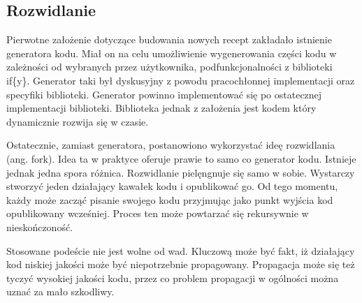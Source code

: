 \documentclass[11pt,a4paper,polish,thesis]{dcsbook}
\begin{document}
\subsection{Rozwidlanie}
Pierwotne założenie dotyczące budowania nowych recept zakładało istnienie generatora kodu. Miał on na celu umożliwienie wygenerowania części kodu w zależności od
wybranych przez użytkownika, podfunkcjonalności z biblioteki if\{y\}. Generator taki był dyskusyjny z powodu pracochłonnej implementacji oraz specyfiki biblioteki.
Generator powinno implementować się po ostatecznej implementacji biblioteki. Biblioteka jednak z założenia jest kodem który dynamicznie rozwija się w czasie.

Ostatecznie, zamiast generatora, postanowiono wykorzystać ideę rozwidlania (ang. fork). Idea ta w praktyce oferuje prawie to samo co generator kodu. Istnieje jednak
jedna spora różnica. Rozwidlanie pielęngnuje się samo w sobie. Wystarczy stworzyć jeden działający kawałek kodu i opublikować go. Od tego momentu, każdy może zacząć pisanie swojego kodu przyjmując jako punkt wyjścia kod opublikowany wcześniej. Proces ten może powtarzać się rekursywnie w nieskończoność.

Stosowane podeście nie jest wolne od wad. Kluczową może być fakt, iż działający kod niskiej jakości może być niepotrzebnie propagowany. Propagacja może się też tyczyć
wysokiej jakości kodu, przez co problem propagacji w ogólności można uznać za mało szkodliwy.
\end{document}
